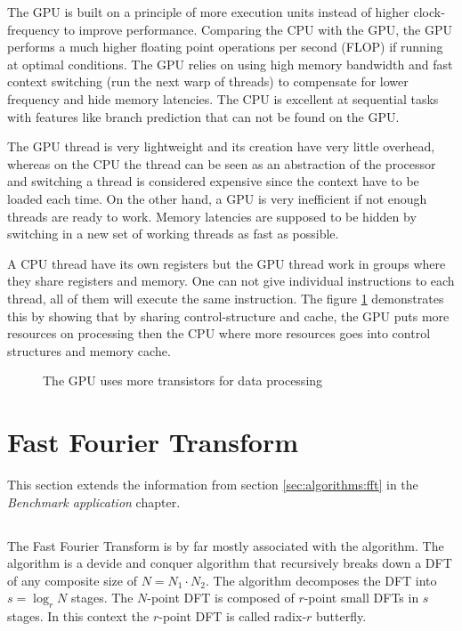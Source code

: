 The GPU is built on a principle of more execution units instead of higher clock-frequency to improve performance. Comparing the CPU with the GPU, the GPU performs a much higher floating point operations per second (FLOP) if running at optimal conditions. The GPU relies on using high memory bandwidth and fast context switching (run the next warp of threads) to compensate for lower frequency and hide memory latencies. The CPU is excellent at sequential tasks with features like branch prediction that can not be found on the GPU.

The GPU thread is very lightweight and its creation have very little overhead, whereas on the CPU the thread can be seen as an abstraction of the processor and switching a thread is considered expensive since the context have to be loaded each time. On the other hand, a GPU is very inefficient if not enough threads are ready to work. Memory latencies are supposed to be hidden by switching in a new set of working threads as fast as possible.

A CPU thread have its own registers but the GPU thread work in groups where they share registers and memory. One can not give individual instructions to each thread, all of them will execute the same instruction. The figure \ref{fig:gpu-vs-cpu} demonstrates this by showing that by sharing control-structure and cache, the GPU puts more resources on processing then the CPU where more resources goes into control structures and memory cache.

\begin{figure}
	\centering
	
	\caption{The GPU uses more transistors for data processing}
	\label{fig:gpu-vs-cpu}
\end{figure}

\section{Fast Fourier Transform}

This section extends the information from section \ref{sec:algorithms:fft} in the \textit{Benchmark application} chapter.

\subsection{\CTALG}

The Fast Fourier Transform is by far mostly associated with the {\CTALG} algorithm. The {\CTALG} algorithm is a devide and conquer algorithm that recursively breaks down a DFT of any composite size of $N = N_1{\cdot}N_2$. The algorithm decomposes the DFT into $s = \log_r{N}$ stages. The $N$-point DFT is composed of $r$-point small DFTs in $s$ stages. In this context the $r$-point DFT is called radix-$r$ butterfly.

